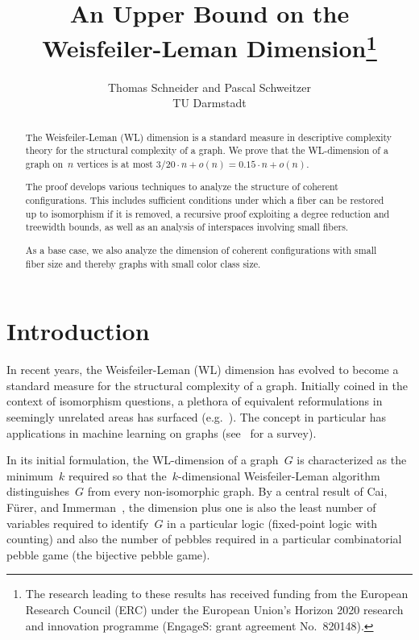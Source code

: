 \documentclass[english,a4paper]{article}
\title{
	An Upper Bound on the Weisfeiler-Leman Dimension\footnote{The research leading to these results has received funding from the European Research Council (ERC) under the European Union’s Horizon 2020 research and innovation programme (EngageS: grant agreement No.\ 820148).}
}
\author{
	Thomas Schneider and Pascal Schweitzer\\
	TU Darmstadt
}
\theoremstyle{plain}
\theoremstyle{definition}
\begin{document}
    \maketitle

    \begin{abstract}
        The Weisfeiler-Leman (WL) dimension is a standard measure in descriptive complexity theory for the structural complexity of a graph. We prove that the WL-dimension of a graph on~$n$ vertices is at most $3/20 \cdot  n + o(n)= 0.15 \cdot n + o(n)$.

        The proof develops various techniques to analyze the structure of coherent configurations. This includes sufficient conditions under which a fiber can be restored up to isomorphism if it is removed, a recursive proof exploiting a degree reduction and treewidth bounds, as well as an analysis of interspaces involving small fibers.

        As a base case, we also analyze the dimension of coherent configurations with small fiber size and thereby graphs with small color class size.
    \end{abstract}


    

\section{Introduction}

In recent years, the Weisfeiler-Leman (WL) dimension has evolved to become a standard measure for the structural complexity of a graph. Initially coined in the context of isomorphism questions\cite{Ba79b,MR0543783,MR1060782}, a plethora of equivalent reformulations in seemingly unrelated areas has surfaced (e.g.~\cite{DBLP:journals/combinatorica/CaiFI92,DBLP:journals/jgt/Dvorak10,DBLP:journals/siamcomp/AtseriasM13,DBLP:journals/jsyml/GroheO15,DBLP:conf/icalp/DellGR18,DBLP:journals/jct/AtseriasMRSSV19}). The concept in particular has applications in machine learning on graphs (see~\cite{Morrisetal2023} for a survey).

In its initial formulation, the WL-dimension of a graph~$G$ is  characterized as the minimum~$k$ required so that the~$k$-dimensional Weisfeiler-Leman algorithm distinguishes~$G$ from every non-isomorphic graph.
By a central result of Cai, F\"{u}rer, and Immerman~\cite{DBLP:journals/combinatorica/CaiFI92}, the dimension plus one is also the least number of variables required to identify~$G$ in a particular logic (fixed-point logic with counting) and also the number of pebbles required in a particular combinatorial pebble game (the bijective pebble game).
\end{document}
